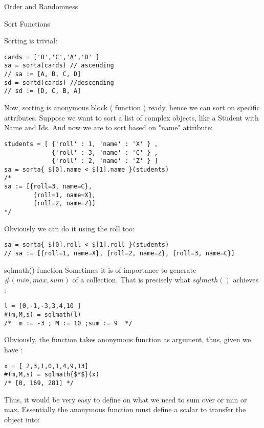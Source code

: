 \begin{section}{Order and Randomness}
\begin{subsection}{Sort Functions}

Sorting is trivial:
\begin{lstlisting}[style=JexlStyle]
cards = ['B','C','A','D' ]
sa = sorta(cards) // ascending 
// sa := [A, B, C, D]
sd = sortd(cards) //descending 
// sd := [D, C, B, A]
\end{lstlisting}  


Now, sorting is anonymous block ( function ) ready, 
hence we can sort on specific attributes. 
Suppose we want to sort a list of complex objects, like a Student with Name and Ids.
And now we are to sort based on "name" attribute: 

\begin{lstlisting}[style=JexlStyle]
students = [ {'roll' : 1, 'name' : 'X' } , 
             {'roll' : 3, 'name' : 'C' } , 
             {'roll' : 2, 'name' : 'Z' } ]
sa = sorta{ $[0].name < $[1].name }(students)
/*
sa := [{roll=3, name=C}, 
        {roll=1, name=X}, 
        {roll=2, name=Z}]
*/
\end{lstlisting}  

Obviously we can do it using the roll too:

\begin{lstlisting}[style=JexlStyle]
sa = sorta{ $[0].roll < $[1].roll }(students)
// sa := [{roll=1, name=X}, {roll=2, name=Z}, {roll=3, name=C}]
\end{lstlisting}  
\end{subsection}

\begin{subsection}{sqlmath() function}
Sometimes it is of importance to generate $\#(min,max,sum)$
of a collection. That is precisely what $sqlmath()$ achieves :

\begin{lstlisting}[style=JexlStyle]
l = [0,-1,-3,3,4,10 ]
#(m,M,s) = sqlmath(l)
/*  m := -3 ; M := 10 ;sum := 9  */
\end{lstlisting}  

Obviously, the function takes anonymous function as argument,
thus, given we have :

\begin{lstlisting}[style=JexlStyle]
x = [ 2,3,1,0,1,4,9,13]
#(m,M,s) = sqlmath{$*$}(x)
/* [0, 169, 281] */
\end{lstlisting}  
 
Thus, it would be very easy to define on what we need to sum over or min or max. 
Essentially the anonymous function must define a scalar to transfer the object into: 


\end{subsection}
\end{section}
